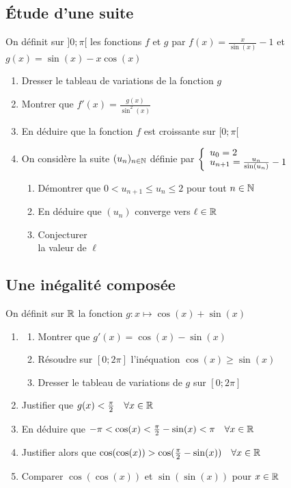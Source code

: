 \documentclass[oneside,12pt]{book}          %
\begin{document}
\subsection{Étude d'une suite}
On définit sur $]0;\pi[$ les fonctions $f$ et $g$ par $f(x)=\frac{x}{\sin(x)}-1$ et $g(x)=\sin(x)-x\cos(x)$
\begin{enumerate}
	\item Dresser le tableau de variations de la fonction $g$
	\item Montrer que $f'(x)=\frac{g(x)}{\sin^2(x)}$
	\item En déduire que la fonction $f$ est croissante sur $[0;\pi[$
	\item On considère la suite ${(u_{n})_{n\in\mathbb N}}$ définie par $\accol{u_0=2\\u_{n+1}=\frac{u_n}{\sin\left(u_n\right)}-1}$
	\begin{enumerate}
		\item Démontrer que $0< u_{n+1}\leq u_n\leq2$ pour tout ${n\in\mathbb N}$
		\item En déduire que $(u_n)$ converge vers $\ell\in{\mathbb R}$
		\item Conjecturer\\
		 la valeur de $\ell$
	\end{enumerate}
\end{enumerate}



\subsection{Une inégalité composée}
On définit sur ${\mathbb R}$ la fonction $g:x\mapsto\cos(x)+\sin(x)$
\begin{enumerate}
    \item \begin{enumerate}
        \item Montrer que $g'(x)=\cos(x)-\sin(x)$
        \item Résoudre sur $[0;2\pi]$ l'inéquation $\cos(x)\geq\sin(x)$
        \item Dresser le tableau de variations de $g$ sur $[0;2\pi]$
    \end{enumerate}
    \item Justifier que $g(x)<\frac{\pi}{2}\quad\forall{x\in\mathbb R}$
    \item En déduire que $-\pi<\cos(x)<\frac{\pi}{2}-\sin(x)<\pi \quad \forall{x\in\mathbb R}$
    \item Justifier alors que $\cos(\cos(x))>\cos(\frac{\pi}{2}-\sin(x)) \quad \forall{x\in\mathbb R}$
    \item Comparer $\cos(\cos(x))$ et $\sin(\sin(x))$ pour ${x\in\mathbb R}$
\end{enumerate}
\end{document}
